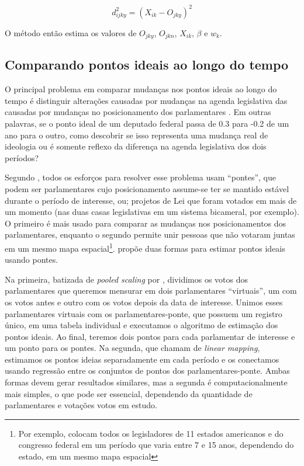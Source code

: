 \documentclass[a4paper,titlepage]{ppgi}\usepackage[]{graphicx}\usepackage[]{color}
\begin{document}
\begin{equation}
d_{ijky}^2 = \left(X_{ik} - O_{jky}\right)^2
\end{equation}

O método então estima os valores de $O_{jky}$, $O_{jkn}$, $X_{ik}$, $\beta$ e
$w_k$.


\subsection{Comparando pontos ideais ao longo do tempo}
\label{cap:fundamentacao:comparando-pontos-ideais-no-tempo}

O principal problema em comparar mudanças nos pontos ideais ao longo do tempo é
distinguir alterações causadas por mudanças na agenda legislativa das causadas
por mudanças no posicionamento dos parlamentares \cite{Bailey2007}. Em outras
palavras, se o ponto ideal de um deputado federal passa de 0.3 para -0.2 de um ano
para o outro, como descobrir se isso representa uma mudança real de ideologia ou
é somente reflexo da diferença na agenda legislativa dos dois períodos?

Segundo , todos os esforços para resolver esse problema
usam ``pontes'', que podem ser parlamentares cujo posicionamento assume-se ter
se mantido estável durante o período de interesse, ou; projetos de Lei que
foram votados em mais de um momento (nas duas casas legislativas em um sistema
bicameral, por exemplo). O primeiro é mais usado para comparar as mudanças nos
posicionamentos dos parlamentares, enquanto o segundo permite unir pessoas que
não votaram juntas em um mesmo mapa espacial\footnote{Por exemplo,
 colocam todos os legisladores de 11 estados americanos e
do congresso federal em um período que varia entre 7 e 15 anos, dependendo do
estado, em um mesmo mapa espacial}.  propõe duas formas
para estimar pontos ideais usando pontes.

Na primeira, batizada de \emph{pooled scaling} por ,
dividimos os votos dos parlamentares que queremos mensurar em dois
parlamentares ``virtuais'', um com os votos antes e outro com os votos depois
da data de interesse. Unimos esses parlamentares virtuais com os
parlamentares-ponte, que possuem um registro único, em uma tabela individual e
executamos o algoritmo de estimação dos pontos ideais. Ao final, teremos dois
pontos para cada parlamentar de interesse e um ponto para os pontes. Na
segunda, que  chamam de \emph{linear mapping}, estimamos
os pontos ideias separadamente em cada período e os conectamos usando regressão
entre os conjuntos de pontos dos parlamentares-ponte. Ambas formas devem gerar
resultados similares, mas a segunda é computacionalmente mais simples, o que
pode ser essencial, dependendo da quantidade de parlamentares e votações votos
em estudo.
\end{document}
